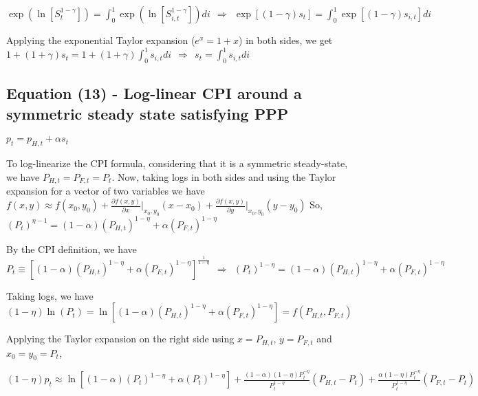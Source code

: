 \documentclass[
]{article}
\begin{document}
\(\displaystyle \exp \left(\ln \left[ S_t^{1-\gamma}\right] \right) = \int_0^1 \exp \left(\ln \left[ S_{i,t}^{1-\gamma}\right] \right)di \ \ \Rightarrow \ \ \exp[(1-\gamma)s_t]=\int_0^1 \exp[(1-\gamma)s_{i,t}]di\)

Applying the exponential Taylor expansion (\(e^x = 1 + x\)) in both
sides, we get
\(\displaystyle 1+(1+\gamma)s_t = 1 + (1+\gamma) \int_0^1 s_{i,t}di \ \ \Rightarrow \ \ s_t = \int_0^1 s_{i,t}di\)

\vspace{12pt}

\hypertarget{equation-13---log-linear-cpi-around-a-symmetric-steady-state-satisfying-ppp}{%
\subsection{Equation (13) - Log-linear CPI around a symmetric steady
state satisfying
PPP}\label{equation-13---log-linear-cpi-around-a-symmetric-steady-state-satisfying-ppp}}

\(p_t = p_{H,t} + \alpha s_t\)

\vspace{8pt}

To log-linearize the CPI formula, considering that it is a symmetric
steady-state, we have \(P_{H,t}=P_{F,t}=P_t\). Now, taking logs in both
sides and using the Taylor expansion for a vector of two variables we
have
\(\displaystyle f(x,y) \approx f(x_0,y_0)+\frac{\partial f(x,y)}{\partial x} \biggr|_{x_0,y_0}(x-x_0)+\frac{\partial f(x,y)}{\partial y} \biggr|_{x_0,y_0}(y-y_0)\)
So,
\(\displaystyle (P_t)^{\eta-1} = (1-\alpha)(P_{H,t})^{1-\eta} + \alpha(P_{F,t})^{1-\eta}\)

By the CPI definition, we have
\(\displaystyle P_t \equiv \left[ (1-\alpha)(P_{H,t})^{1-\eta} + \alpha(P_{F,t})^{1-\eta} \right]^{\frac{1}{1-\eta}} \ \ \Rightarrow \ \ (P_t)^{1-\eta} = (1-\alpha)(P_{H,t})^{1-\eta} + \alpha(P_{F,t})^{1-\eta}\)

Taking logs, we have
\((1-\eta)\ln(P_t) = \ln\left[ (1-\alpha)(P_{H,t})^{1-\eta} + \alpha(P_{F,t})^{1-\eta} \right]=f(P_{H,t},P_{F,t})\)

Applying the Taylor expansion on the right side using \(x = P_{H,t}\),
\(y = P_{F,t}\) and \(x_0 = y_0 = P_t\),

\(\displaystyle (1-\eta)p_t \approx \ln \left[ (1-\alpha)(P_t)^{1-\eta} + \alpha(P_t)^{1-\eta} \right]+ \frac{(1-\alpha)(1-\eta)P_t^{-\eta}}{P_t^{1-\eta}}(P_{H,t}-P_t) + \frac{\alpha(1-\eta)P_t^{-\eta}}{P_t^{1-\eta}}(P_{F,t}-P_t)\)
\end{document}
